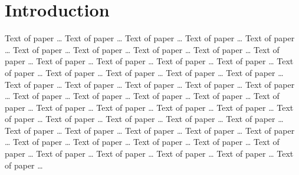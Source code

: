 \section{Introduction}

Text of paper \ldots
Text of paper \ldots
Text of paper \ldots
Text of paper \ldots
Text of paper \ldots
Text of paper \ldots
Text of paper \ldots
Text of paper \ldots
Text of paper \ldots
Text of paper \ldots
Text of paper \ldots
Text of paper \ldots
Text of paper \ldots
Text of paper \ldots
Text of paper \ldots
Text of paper \ldots
Text of paper \ldots
Text of paper \ldots
Text of paper \ldots
Text of paper \ldots
Text of paper \ldots
Text of paper \ldots
Text of paper \ldots
Text of paper \ldots
Text of paper \ldots
Text of paper \ldots
Text of paper \ldots
Text of paper \ldots
Text of paper \ldots
Text of paper \ldots
Text of paper \ldots
Text of paper \ldots
Text of paper \ldots
Text of paper \ldots
Text of paper \ldots
Text of paper \ldots
Text of paper \ldots
Text of paper \ldots
Text of paper \ldots
Text of paper \ldots
Text of paper \ldots
Text of paper \ldots
Text of paper \ldots
Text of paper \ldots
Text of paper \ldots
Text of paper \ldots
Text of paper \ldots
Text of paper \ldots
Text of paper \ldots
Text of paper \ldots
Text of paper \ldots
Text of paper \ldots
Text of paper \ldots \cite{Churchill2017}



